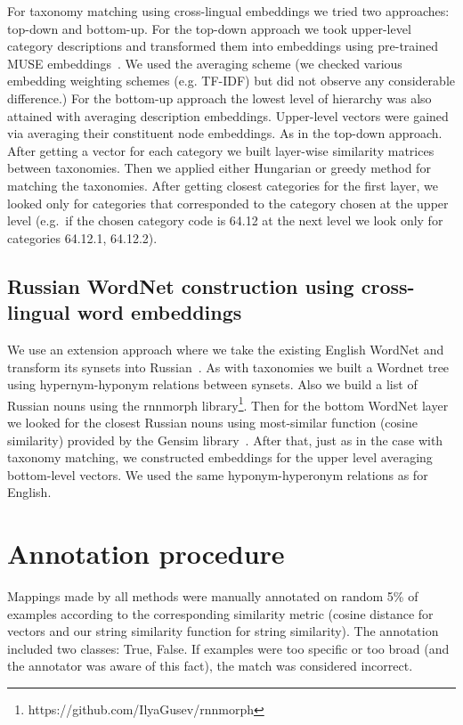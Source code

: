 \documentclass[11pt,a4paper]{article}
\begin{document}
For taxonomy matching using cross-lingual embeddings we tried two approaches: top-down and bottom-up. For the top-down approach we took upper-level category descriptions and transformed them into embeddings using pre-trained MUSE embeddings\ \cite{muse}. We used the averaging scheme (we checked various embedding weighting schemes (e.g. TF-IDF) but did not observe any considerable difference.)
For the bottom-up approach the lowest level of hierarchy was also attained with averaging description embeddings. Upper-level vectors were gained via averaging their constituent node embeddings. As in the top-down approach.
After getting a vector for each category we built layer-wise similarity matrices between taxonomies. Then we applied either Hungarian or greedy method for matching the taxonomies. After getting closest categories for the first layer, we looked only for categories that corresponded to the category chosen at the upper level (e.g.\ if the chosen category code is 64.12 at the next level we look only for categories 64.12.1, 64.12.2).

\subsection{Russian WordNet construction using cross-lingual word embeddings}
We use an extension approach where we take the existing English WordNet and transform its synsets into Russian\ \cite{NEALE18.1030}. As with taxonomies we built a Wordnet tree using hypernym-hyponym relations between synsets. Also we build a list of Russian nouns using the rnnmorph library\footnote{https://github.com/IlyaGusev/rnnmorph}. Then for the bottom WordNet layer we looked for the closest Russian nouns using most-similar function (cosine similarity) provided by the Gensim library~\cite{gensim}. After that, just as in the case with taxonomy matching, we constructed embeddings for the upper level averaging bottom-level vectors. We used the same hyponym-hyperonym relations as for English.
\section{Annotation procedure}

Mappings made by all methods were manually annotated on random 5\% of examples according to the corresponding similarity metric (cosine distance for vectors and our string similarity function for string similarity). The annotation included two classes: True, False. If examples were too specific or too broad (and the annotator was aware of this fact), the match was considered incorrect.
\end{document}
